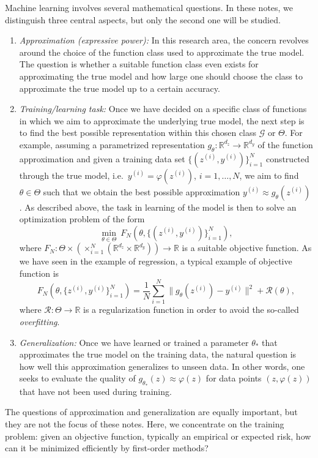 \documentclass[12pt,openany]{book}
\theoremstyle{definition}
\theoremstyle{definition}
\newcommand{\cG}{\mathcal{G}}
\newcommand{\R}{\mathbb{R}}
\begin{document}
Machine learning involves several mathematical questions. In these notes, we distinguish three
central aspects, but only the second one will be studied.
\begin{enumerate}
\item \textit{Approximation (expressive power):} In this research area, the concern revolves around the choice of the function class used to approximate the true model. The question is whether a suitable function class even exists for approximating the true model and how large one should choose the class to approximate the true model up to a certain accuracy.
\item \textit{Training/learning task:} Once we have decided on a specific class of functions in which we aim to approximate the underlying true model, the next step is to find the best possible representation within this chosen class $\cG$ or $\Theta$. For example, assuming a parametrized representation $g_\theta:\R^{d_z}\to\R^{d_y}$ of the function approximation and given a training data set $\{(z^{(i)},y^{(i)})\}_{i=1}^N$ constructed through the true model, i.e.~$y^{(i)} = \varphi(z^{(i)})$, $i=1,\dots,N$, we aim to find $\theta\in\Theta$ such that we obtain the best possible approximation $y^{(i)}\approx g_\theta(z^{(i)})$. As described above, the task in learning of the model is then to solve an optimization problem of the form
\[\min_{\theta\in\Theta}\ F_N(\theta,\{(z^{(i)},y^{(i)})\}_{i=1}^N),\]
where $F_N:\Theta\times \left(\times_{i=1}^N (\R^{d_z}\times \R^{d_y})\right)\to\R$ is a suitable objective function. As we have seen in the example of regression, a typical example of objective function is
\[F_N(\theta,\{z^{(i)},y^{(i)}\}_{i=1}^N) = \frac{1}{N} \sum_{i=1}^N\|g_\theta(z^{(i)}) - y^{(i)}\|^2 + \mathcal R(\theta), \]
where $\mathcal R:\Theta\to\R$ is a regularization function in order to avoid the so-called \textit{overfitting}. 
\item \textit{Generalization:} Once we have learned or trained a parameter $\theta_\ast$ that approximates the true model on the training data, the natural question is how well this
approximation generalizes to unseen data. In other words, one seeks to evaluate the quality of
\(
g_{\theta_\ast}(z) \approx \varphi(z)
\)
for data points $(z,\varphi(z))$ that have not been used during training.
\end{enumerate}

The questions of approximation and generalization are equally important, but they are not the focus of these notes. Here, we concentrate on the training problem: given an objective function, typically an empirical or expected risk, how can it be minimized efficiently by first-order methods?
\end{document}
